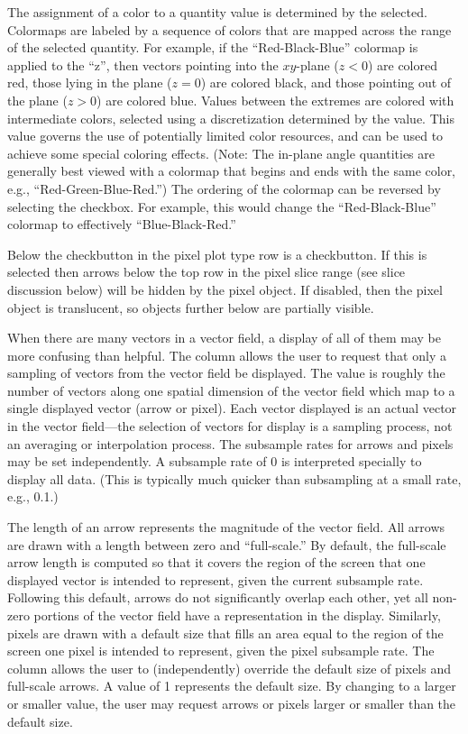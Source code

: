 The assignment of a color to a quantity value is determined by the
 selected.  Colormaps are labeled by a
sequence of colors that are mapped across the range of the selected
quantity.  For example, if the ``Red-Black-Blue'' colormap is applied to
the {} ``z'', then vectors pointing into the
$xy$-plane ($z<0$) are colored red, those lying in the plane ($z=0$) are
colored black, and those pointing out of the plane ($z>0$) are colored
blue.  Values between the extremes are colored with intermediate colors,
selected using a discretization determined by the 
value.  This value governs the use of potentially limited color
resources, and can be used to achieve some special coloring effects.
(Note: The in-plane angle quantities are generally best viewed with a
colormap that begins and ends with the same color, e.g.,
``Red-Green-Blue-Red.'')  The ordering of the colormap can be reversed
by selecting the  checkbox.  For example, this would change
the ``Red-Black-Blue'' colormap to effectively ``Blue-Black-Red.''

Below the  checkbutton in the pixel plot type row is a
 checkbutton.  If this is selected then arrows below the top
row in the pixel slice range (see slice discussion below) will be hidden
by the pixel object.  If disabled, then the pixel object is translucent,
so objects further below are partially visible.

When there are many vectors in a vector field, a display of all of them
may be more confusing than helpful.  The  column
allows the user to request that only a sampling of vectors from the
vector field be displayed.  The  value is roughly
the number of vectors along one spatial dimension of the vector field
which map to a single displayed vector (arrow or pixel).  Each vector
displayed is an actual vector in the vector field---the selection of
vectors for display is a sampling process, not an averaging or
interpolation process.  The subsample rates for arrows and pixels may be
set independently.  A subsample rate of 0 is interpreted specially to
display all data.  (This is typically much quicker than subsampling at a
small rate, e.g., 0.1.)

The length of an arrow represents the magnitude of the vector field.
All arrows are drawn with a length between zero and ``full-scale.''
By default, the full-scale arrow length is computed
so that it covers the region of the screen that one displayed
vector is intended to represent, given the current subsample rate.
Following this default, arrows do not significantly overlap each other,
yet all non-zero portions of the vector field have
a representation in the display.  Similarly, pixels are drawn with
a default size that fills an area equal to the region of the screen
one pixel is intended to represent, given the pixel subsample rate.
The  column allows the user to (independently)
override the default size of pixels and full-scale arrows.
A value of 1 represents the default size.  By
changing to a larger or smaller  value, the user may
request arrows or pixels larger or smaller than the default size.

